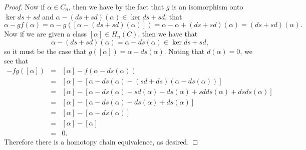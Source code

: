 \documentclass[10pt]{amsart}
\begin{document}
\begin{ex}
\begin{proof}
    Now if $\alpha \in C_n$, then we have by the fact that $g$ is an isomorphism onto $\ker ds + sd$ and $\alpha - (ds + sd)(\alpha) \in \ker ds + sd$, that
    $$\alpha - gf(\alpha) = \alpha - g([\alpha - (ds + sd)(\alpha)]) = \alpha - \alpha + (ds + sd)(\alpha) = (ds + sd)(\alpha).$$
    Now if we are given a class $[\alpha] \in H_n(C)$, then we have that
    $$\alpha - (ds + sd)(\alpha) = \alpha - ds(\alpha) \in \ker ds + sd,$$
    so it must be the case that $g([\alpha]) = \alpha - ds(\alpha)$.
    Noting that $d(\alpha) = 0$, we see that
    \begin{eqnarray*}
      [\alpha] - fg([\alpha]) &=& [\alpha] - f(\alpha - ds(\alpha))\\
      &=& [\alpha] - [\alpha - ds(\alpha) - (sd + ds)(\alpha - ds(\alpha))]\\
      &=& [\alpha] - [\alpha - ds(\alpha) - sd(\alpha) - ds(\alpha) + sdds(\alpha) + dsds(\alpha)]\\
      &=& [\alpha] - [\alpha - ds(\alpha) - ds(\alpha) + ds(\alpha)]\\
      &=& [\alpha] - [\alpha - ds(\alpha)]\\
      &=& [\alpha] - [\alpha]\\
      &=& 0.
    \end{eqnarray*}
    Therefore there is a homotopy chain equivalence, as desired.
  \end{proof}
\end{ex}

\setcounter{ex}{3}
\end{document}
